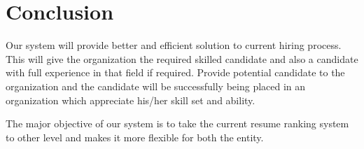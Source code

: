 
\chapter{Conclusion}

Our system will provide better and efficient solution to current hiring process. This will give the organization the required skilled candidate and also a candidate with full experience in that field if required. Provide potential candidate to the organization and the candidate will be successfully being placed in an organization which appreciate his/her skill set and ability.

The major objective of our system is to take the current resume ranking system to other level and makes it more flexible for both the entity.